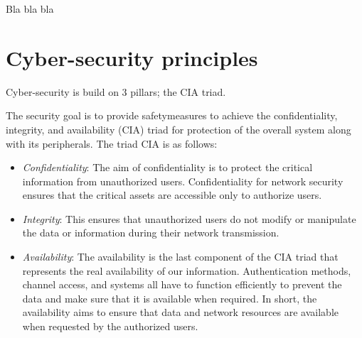 Bla bla bla


\section {Cyber-security principles}
\medskip
{\Huge C}yber-security is build on 3 pillars; the CIA triad.


The security goal is to provide safetymeasures to achieve the confidentiality, integrity, and availability (CIA) triad for protection of the overall system along with its peripherals. The triad CIA is as follows:
\begin{itemize}
    \setlength\itemsep{1em}
    \item \emph{Confidentiality}: The aim of confidentiality is to protect the critical information from unauthorized users. Confidentiality for network security ensures that the critical assets are accessible only to authorize users.
    \item \emph{Integrity}: This ensures that unauthorized users do not modify or manipulate the data or information during their network transmission.
    \item \emph{Availability}: The availability is the last component of the CIA triad that represents the real availability of our information. Authentication methods, channel access, and systems all have to function efficiently to prevent the data and make sure that it is available when required. In short, the availability aims to ensure that data and network resources are available when requested by the authorized users.    
\end{itemize}



